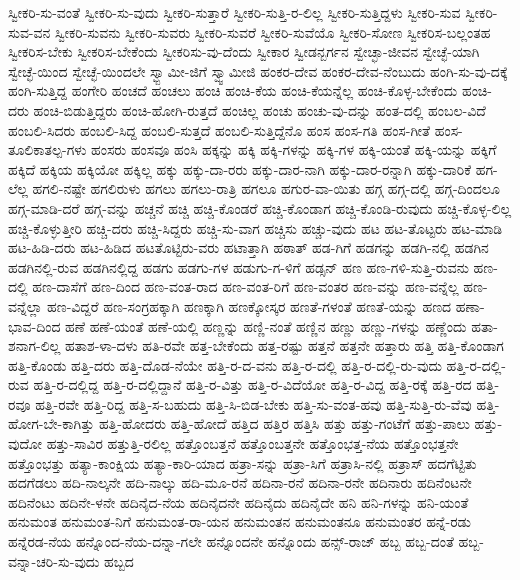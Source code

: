 {ಸ್ವೀಕರಿ-ಸು-ವಂತೆ
ಸ್ವೀಕರಿ-ಸು-ವುದು
ಸ್ವೀಕರಿ-ಸುತ್ತಾರೆ
ಸ್ವೀಕರಿ-ಸುತ್ತಿ-ರ-ಲಿಲ್ಲ
ಸ್ವೀಕರಿ-ಸುತ್ತಿದ್ದಳು
ಸ್ವೀಕರಿ-ಸುವ
ಸ್ವೀಕರಿ-ಸುವ-ವನ
ಸ್ವೀಕರಿ-ಸುವನು
ಸ್ವೀಕರಿ-ಸುವರು
ಸ್ವೀಕರಿ-ಸುವರೆ
ಸ್ವೀಕರಿ-ಸುವೆಯೊ
ಸ್ವೀಕರಿ-ಸೋಣ
ಸ್ವೀಕರಿಸ-ಬಲ್ಲಂತಹ
ಸ್ವೀಕರಿಸ-ಬೇಕು
ಸ್ವೀಕರಿಸ-ಬೇಕೆಂದು
ಸ್ವೀಕರಿಸು-ವು-ದೆಂದು
ಸ್ವೀಕಾರ
ಸ್ವೀಡನ್ಬರ್ಗನ
ಸ್ವೇಚ್ಛಾ-ಜೀವನ
ಸ್ವೇಚ್ಛೆ-ಯಾಗಿ
ಸ್ವೇಚ್ಛೆ-ಯಿಂದ
ಸ್ವೇಚ್ಛೆ-ಯಿಂದಲೇ
ಸ್ವ್ಬಾಮೀ-ಜಿಗೆ
ಸ್ವ್ವಾಮೀಜಿ
ಹಂಕರ-ದೇವ
ಹಂಕರ-ದೇವ-ನೆಂಬುದು
ಹಂಗಿ-ಸು-ವು-ದಕ್ಕೆ
ಹಂಗಿ-ಸುತ್ತಿದ್ದ
ಹಂಗೇರಿ
ಹಂಚದೆ
ಹಂಚಲು
ಹಂಚಿ
ಹಂಚಿ-ಕೆಯ
ಹಂಚಿ-ಕೆಯನ್ನೆಲ್ಲ
ಹಂಚಿ-ಕೊಳ್ಳ-ಬೇಕೆಂದು
ಹಂಚಿ-ದರು
ಹಂಚಿ-ಬಿಡುತ್ತಿದ್ದರು
ಹಂಚಿ-ಹೋಗಿ-ರುತ್ತದೆ
ಹಂಚಿಲ್ಲ
ಹಂಚು
ಹಂಚು-ವು-ದನ್ನು
ಹಂತ-ದಲ್ಲಿ
ಹಂಬಲ-ವಿದೆ
ಹಂಬಲಿ-ಸಿದರು
ಹಂಬಲಿ-ಸಿದ್ದ
ಹಂಬಲಿ-ಸುತ್ತದೆ
ಹಂಬಲಿ-ಸುತ್ತಿದ್ದೆನೊ
ಹಂಸ
ಹಂಸ-ಗತಿ
ಹಂಸ-ಗೀತೆ
ಹಂಸ-ತೂಲಿಕಾತಲ್ಪ-ಗಳು
ಹಂಸರು
ಹಂಸವೂ
ಹಂಸಿ
ಹಕ್ಕನ್ನು
ಹಕ್ಕಿ
ಹಕ್ಕಿ-ಗಳನ್ನು
ಹಕ್ಕಿ-ಗಳ
ಹಕ್ಕಿ-ಯಂತೆ
ಹಕ್ಕಿ-ಯನ್ನು
ಹಕ್ಕಿಗೆ
ಹಕ್ಕಿದೆ
ಹಕ್ಕಿಯ
ಹಕ್ಕಿಯೋ
ಹಕ್ಕಿಲ್ಲ
ಹಕ್ಕು
ಹಕ್ಕು-ದಾ-ರರು
ಹಕ್ಕು-ದಾರ-ನಾಗಿ
ಹಕ್ಕು-ದಾರ-ರನ್ನಾಗಿ
ಹಕ್ಕು-ದಾರಿಕೆ
ಹಗ-ಲೆಲ್ಲ
ಹಗಲಿ-ನಷ್ಟೇ
ಹಗಲಿರುಳು
ಹಗಲು
ಹಗಲು-ರಾತ್ರಿ
ಹಗಲೂ
ಹಗುರ-ವಾ-ಯಿತು
ಹಗ್ಗ
ಹಗ್ಗ-ದಲ್ಲಿ
ಹಗ್ಗ-ದಿಂದಲೂ
ಹಗ್ಗ-ಮಾಡಿ-ದರೆ
ಹಗ್ಗ-ವನ್ನು
ಹಚ್ಚನೆ
ಹಚ್ಚಿ
ಹಚ್ಚಿ-ಕೊಂಡರೆ
ಹಚ್ಚಿ-ಕೊಂಡಾಗ
ಹಚ್ಚಿ-ಕೊಂಡಿ-ರುವುದು
ಹಚ್ಚಿ-ಕೊಳ್ಳ-ಲಿಲ್ಲ
ಹಚ್ಚಿ-ಕೊಳ್ಳುತ್ತೀರಿ
ಹಚ್ಚಿ-ದರು
ಹಚ್ಚಿ-ಸಿದ್ದರು
ಹಚ್ಚಿ-ಸು-ವಾಗ
ಹಚ್ಚಿಸು
ಹಚ್ಚು-ವುದು
ಹಟ
ಹಟ-ತೊಟ್ಟರು
ಹಟ-ಮಾಡಿ
ಹಟ-ಹಿಡಿ-ದರು
ಹಟ-ಹಿಡಿದ
ಹಟತೊಟ್ಟಿರು-ವರು
ಹಟಾತ್ತಾಗಿ
ಹಠಾತ್
ಹಡ-ಗಿಗೆ
ಹಡಗನ್ನು
ಹಡಗಿ-ನಲ್ಲಿ
ಹಡಗಿನ
ಹಡಗಿನಲ್ಲಿ-ರುವ
ಹಡಗಿನಲ್ಲಿದ್ದ
ಹಡಗು
ಹಡಗು-ಗಳ
ಹಡುಗು-ಗ-ಳಿಗೆ
ಹಡ್ಸನ್
ಹಣ
ಹಣ-ಗಳಿ-ಸುತ್ತಿ-ರುವನು
ಹಣ-ದಲ್ಲಿ
ಹಣ-ದಾಸೆಗೆ
ಹಣ-ದಿಂದ
ಹಣ-ವಂತ-ರಾದ
ಹಣ-ವಂತ-ರಿಗೆ
ಹಣ-ವಂತರ
ಹಣ-ವನ್ನು
ಹಣ-ವನ್ನೆಲ್ಲ
ಹಣ-ವನ್ನೆಲ್ಲಾ
ಹಣ-ವಿದ್ದರೆ
ಹಣ-ಸಂಗ್ರಹಕ್ಕಾಗಿ
ಹಣಕ್ಕಾಗಿ
ಹಣಕ್ಕೋಸ್ಕರ
ಹಣತೆ-ಗಳಂತೆ
ಹಣತೆ-ಯನ್ನು
ಹಣದ
ಹಣಾ-ಭಾವ-ದಿಂದ
ಹಣೆ
ಹಣೆ-ಯಂತೆ
ಹಣೆ-ಯಲ್ಲಿ
ಹಣ್ಣನ್ನು
ಹಣ್ಣಿ-ನಂತೆ
ಹಣ್ಣಿನ
ಹಣ್ಣು
ಹಣ್ಣು-ಗಳನ್ನು
ಹಣ್ಣೆಂದು
ಹತಾ-ಶನಾಗ-ಲಿಲ್ಲ
ಹತಾಶ-ಳಾ-ದಳು
ಹತಿ-ರವೇ
ಹತ್ತ-ಬೇಕೆಂದು
ಹತ್ತ-ರಷ್ಟು
ಹತ್ತನೆ
ಹತ್ತನೇ
ಹತ್ತಾರು
ಹತ್ತಿ
ಹತ್ತಿ-ಕೊಂಡಾಗ
ಹತ್ತಿ-ಕೊಂಡು
ಹತ್ತಿ-ದರು
ಹತ್ತಿ-ದೊಡ-ನೆಯೇ
ಹತ್ತಿ-ರ-ದ-ವನು
ಹತ್ತಿ-ರ-ದಲ್ಲಿ
ಹತ್ತಿ-ರ-ದಲ್ಲಿ-ರು-ವುದು
ಹತ್ತಿ-ರ-ದಲ್ಲಿ-ರುವ
ಹತ್ತಿ-ರ-ದಲ್ಲಿದ್ದ
ಹತ್ತಿ-ರ-ದಲ್ಲಿದ್ದಾನೆ
ಹತ್ತಿ-ರ-ವಿತ್ತು
ಹತ್ತಿ-ರ-ವಿದೆಯೋ
ಹತ್ತಿ-ರ-ವಿದ್ದ
ಹತ್ತಿ-ರಕ್ಕೆ
ಹತ್ತಿ-ರದ
ಹತ್ತಿ-ರವೂ
ಹತ್ತಿ-ರವೇ
ಹತ್ತಿ-ರಿದ್ದ
ಹತ್ತಿ-ಸ-ಬಹುದು
ಹತ್ತಿ-ಸಿ-ಬಿಡ-ಬೇಕು
ಹತ್ತಿ-ಸು-ವಂತ-ಹವು
ಹತ್ತಿ-ಸುತ್ತಿ-ರು-ವೆವು
ಹತ್ತಿ-ಹೋಗ-ಬೇ-ಕಾಗಿತ್ತು
ಹತ್ತಿ-ಹೋದರು
ಹತ್ತಿ-ಹೋದೆ
ಹತ್ತಿದ
ಹತ್ತಿರ
ಹತ್ತಿಸಿ
ಹತ್ತು
ಹತ್ತು-ಗಂಟೆಗೆ
ಹತ್ತು-ಪಾಲು
ಹತ್ತು-ವುದೋ
ಹತ್ತು-ಸಾವಿರ
ಹತ್ತುತ್ತಿ-ರಲಿಲ್ಲ
ಹತ್ತೊಂಬತ್ತನೆ
ಹತ್ತೊಂಬತ್ತನೇ
ಹತ್ತೊಂಭತ್ತ-ನೆಯ
ಹತ್ತೊಂಭತ್ತನೇ
ಹತ್ತೊಂಭತ್ತು
ಹತ್ಯಾ-ಕಾಂಕ್ಷಿಯ
ಹತ್ಯಾ-ಕಾರಿ-ಯಾದ
ಹತ್ರಾ-ಸನ್ನು
ಹತ್ರಾ-ಸಿಗೆ
ಹತ್ರಾಸಿ-ನಲ್ಲಿ
ಹತ್ರಾಸ್
ಹದಗೆಟ್ಟಿತು
ಹದಗೆಡಲು
ಹದಿ-ನಾಲ್ಕನೇ
ಹದಿ-ನಾಲ್ಕು
ಹದಿ-ಮೂ-ರನೆ
ಹದಿನಾ-ರನೆ
ಹದಿನಾ-ರನೇ
ಹದಿನಾರು
ಹದಿನೆಂಟನೇ
ಹದಿನೆಂಟು
ಹದಿನೇ-ಳನೇ
ಹದಿನೈದ-ನೆಯ
ಹದಿನೈದನೇ
ಹದಿನೈದು
ಹದಿನೈದೇ
ಹನಿ
ಹನಿ-ಗಳನ್ನು
ಹನಿ-ಯಂತೆ
ಹನುಮಂತ
ಹನುಮಂತ-ನಿಗೆ
ಹನುಮಂತ-ರಾ-ಯನ
ಹನುಮಂತನ
ಹನುಮಂತನೂ
ಹನುಮಂತರ
ಹನ್ನೆ-ರಡು
ಹನ್ನೆರಡ-ನೆಯ
ಹನ್ನೊಂದ-ನೆಯ-ದನ್ನಾ-ಗಲೇ
ಹನ್ನೊಂದನೇ
ಹನ್ನೊಂದು
ಹನ್ಸ್-ರಾಜ್
ಹಬ್ಬ
ಹಬ್ಬ-ದಂತೆ
ಹಬ್ಬ-ವನ್ನಾ-ಚರಿ-ಸು-ವುದು
ಹಬ್ಬದ
}
